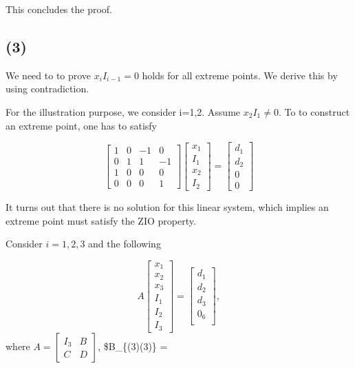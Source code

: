 \documentclass[11pt]{article}
\begin{document}
This concludes the proof.

    \hypertarget{section}{%
\subsection{(3)}\label{section}}

We need to to prove \(x_iI_{i-1}=0\) holds for all extreme points. We
derive this by using contradiction.

For the illustration purpose, we consider i=1,2. Assume
\(x_2I_1\neq 0\). To to construct an extreme point, one has to satisfy

\[
\begin{bmatrix}
1 & 0 & -1 & 0 \\
0 & 1 & 1 & -1 \\
1 & 0 & 0 & 0 \\
0 & 0 & 0 & 1
\end{bmatrix}
\begin{bmatrix}
x_1 \\
I_1 \\
x_2 \\
I_2
\end{bmatrix}=
\begin{bmatrix}
d_1 \\
d_2 \\
0 \\
0
\end{bmatrix}
\]

It turns out that there is no solution for this linear system, which
implies an extreme point must satisfy the ZIO property.

Consider \(i=1,2,3\) and the following

\[A
\begin{bmatrix}
x_1 \\
x_2 \\
x_3 \\
I_1 \\
I_2 \\
I_3
\end{bmatrix}
=\begin{bmatrix}
d_1 \\
d_2 \\
d_3 \\
0_6 \\
\end{bmatrix},
\] where \(A=\begin{bmatrix} I_{3} & B\\ C & D \end{bmatrix}\),
\$B\_\{(3)\times (3)\} =\\
\end{document}

